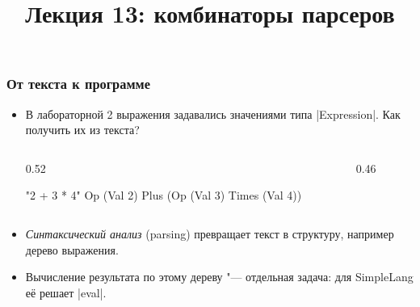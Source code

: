 \documentclass[11pt]{beamer}
\title{Лекция 13: комбинаторы парсеров}
\begin{document}
\begin{frame}[plain]
  \maketitle
\end{frame}

\begin{frame}[fragile]
  \frametitle{От текста к программе}
  \begin{itemize}
    \item В лабораторной 2 выражения задавались значениями типа \haskinline|Expression|. Как получить их из текста?
      \begin{columns}[c,onlytextwidth]
        \begin{column}{0.52\linewidth}
          \begin{haskellsmall}
            "2 + 3 * 4"
            Op (Val 2) Plus
               (Op (Val 3) Times (Val 4))
          \end{haskellsmall}
        \end{column}
        \begin{column}{0.46\linewidth}
          \centering
        \end{column}
      \end{columns}
      \pause
    \item \emph{Синтаксический анализ} (parsing) превращает текст в структуру, например дерево выражения.
    \item Вычисление результата по этому дереву "--- отдельная задача: для SimpleLang её решает \haskinline|eval|.
  \end{itemize}
\end{frame}
\end{document}
